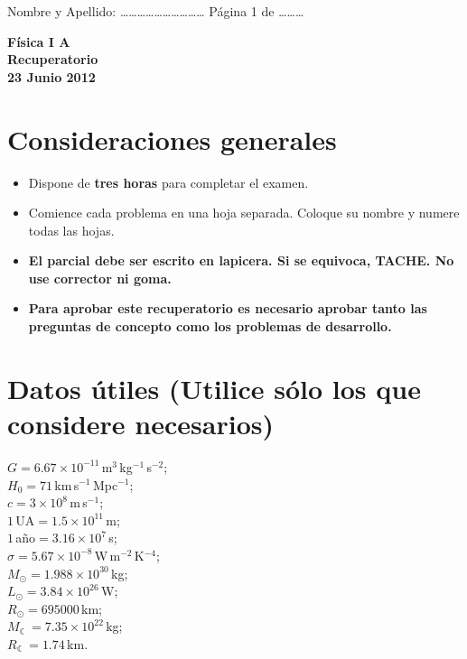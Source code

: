 \documentclass[a4paper,12pt]{article}
\begin{document}
\pagestyle{empty}
Nombre y Apellido: \ldots\ldots\ldots\ldots\ldots\ldots\ldots\ldots\ldots\ldots
Página 1 de \ldots\ldots\ldots \begin{center}
{\Large {\bf{Física I A}}} \\
\bigskip
{\large {\bf{Recuperatorio}}} \\ {\bf{23 Junio 2012}} \\
\end{center}

\section*{Consideraciones generales}

\begin{itemize}
\item Dispone de {\bf{tres horas}} para completar el examen.
\item Comience cada problema en una hoja separada. Coloque su nombre y
numere todas las hojas.
\item {\bf{El parcial debe ser escrito en lapicera. Si se equivoca, TACHE. No
use corrector ni goma.}}
\item {\bf{Para aprobar este recuperatorio es necesario aprobar tanto las
preguntas de concepto como los problemas de desarrollo.}}
\end{itemize}

\section*{Datos útiles (Utilice sólo los que considere necesarios)}
 
\indent $G = 6.67 \times 10^{-11}$\,m$^3$\,kg$^{-1}$\,s$^{-2}$;\\
\indent $H_0 = 71 $\,km\,s$^{-1}$\,Mpc$^{-1}$;\\
\indent $c = 3 \times 10^{8}$\,m\,s$^{-1}$;\\
\indent $1\mathrm{\,UA} = 1.5 \times 10^{11}$\,m;\\
\indent $1$\,año$=3.16 \times 10^{7}$\,s;\\
\indent $\sigma = 5.67 \times 10^{-8}$\,W\,m$^{-2}$\,K$^{-4}$;\\
\indent $M_\odot = 1.988\times10^{30}$\,kg;\\
\indent $L_\odot = 3.84\times10^{26}$\,W;\\
\indent $R_\odot=695000$\,km;\\
\indent $M_{\leftmoon} = 7.35\times10^{22}$\,kg;\\
\indent $R_{\leftmoon} = 1.74$\,km.
\end{document}
